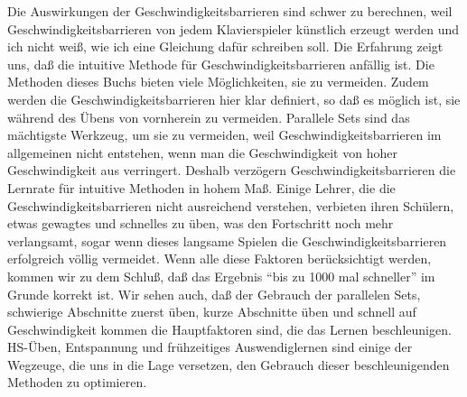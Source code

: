 Die Auswirkungen der Geschwindigkeitsbarrieren sind schwer zu berechnen, weil Geschwindigkeitsbarrieren von jedem Klavierspieler künstlich erzeugt werden und ich nicht weiß, wie ich eine Gleichung dafür schreiben soll.
Die Erfahrung zeigt uns, daß die intuitive Methode für Geschwindigkeitsbarrieren anfällig ist.
Die Methoden dieses Buchs bieten viele Möglichkeiten, sie zu vermeiden.
Zudem werden die Geschwindigkeitsbarrieren hier klar definiert, so daß es möglich ist, sie während des Übens von vornherein zu vermeiden.
Parallele Sets sind das mächtigste Werkzeug, um sie zu vermeiden, weil Geschwindigkeitsbarrieren im allgemeinen nicht entstehen, wenn man die Geschwindigkeit von hoher Geschwindigkeit aus verringert.
Deshalb verzögern Geschwindigkeitsbarrieren die Lernrate für intuitive Methoden in hohem Maß.
Einige Lehrer, die die Geschwindigkeitsbarrieren nicht ausreichend verstehen, verbieten ihren Schülern, etwas gewagtes und schnelles zu üben, was den Fortschritt noch mehr verlangsamt, sogar wenn dieses langsame Spielen die Geschwindigkeitsbarrieren erfolgreich völlig vermeidet.
Wenn alle diese Faktoren berücksichtigt werden, kommen wir zu dem Schluß, daß das Ergebnis \enquote{bis zu 1000 mal schneller} im Grunde korrekt ist.
Wir sehen auch, daß der Gebrauch der parallelen Sets, schwierige Abschnitte zuerst üben, kurze Abschnitte üben und schnell auf Geschwindigkeit kommen die Hauptfaktoren sind, die das Lernen beschleunigen.
HS-Üben, Entspannung und frühzeitiges Auswendiglernen sind einige der Wegzeuge, die uns in die Lage versetzen, den Gebrauch dieser beschleunigenden Methoden zu optimieren.



